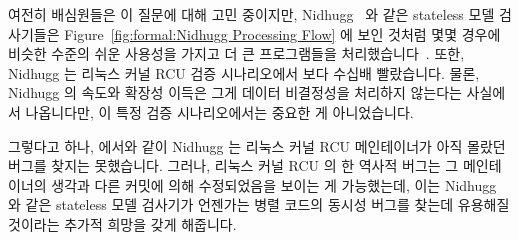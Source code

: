 여전히 배심원들은 이 질문에 대해 고민 중이지만,
Nidhugg~\cite{CarlLeonardsson2014Nidhugg} 와 같은 stateless 모델 검사기들은
Figure~\ref{fig:formal:Nidhugg Processing Flow} 에 보인 것처럼 몇몇 경우에
비슷한 수준의 쉬운 사용성을 가지고 더 큰 프로그램들을
처리했습니다~\cite{SMC-TreeRCU}.
또한, Nidhugg 는 리눅스 커널 RCU 검증 시나리오에서  보다 수십배
빨랐습니다.
물론, Nidhugg 의 속도와 확장성 이득은 그게 데이터 비결정성을 처리하지 않는다는
사실에서 나옵니다만, 이 특정 검증 시나리오에서는 중요한 게 아니었습니다.

그렇다고 하나,  에서와 같이 Nidhugg 는 리눅스 커널 RCU 메인테이너가
아직 몰랐던 버그를 찾지는 못했습니다.
그러나, 리눅스 커널 RCU 의 한 역사적 버그는 그 메인테이너의 생각과 다른 커밋에
의해 수정되었음을 보이는 게 가능했는데, 이는 Nidhugg 와 같은 stateless 모델
검사기가 언젠가는 병렬 코드의 동시성 버그를 찾는데 유용해질 것이라는 추가적
희망을 갖게 해줍니다.

